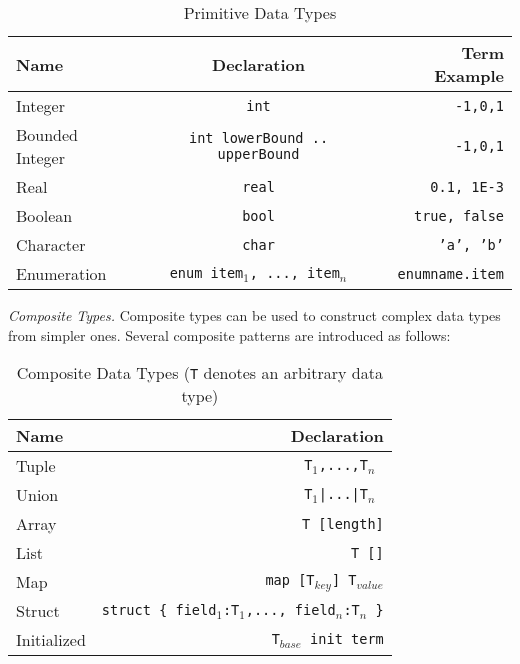 \begin{table}
    \caption{Primitive Data Types}
    \label{table:primitivetypes}
    \centering
    \begin{tabular}{lcr}
        \hline
        Name & Declaration & Term Example \T\B \\
        \hline
        \T 
        Integer & \texttt{int} & \texttt{-1,0,1} \\
        Bounded Integer\hspace{0.5cm} & \texttt{int lowerBound .. upperBound}\hspace{0.5cm} & \texttt{-1,0,1} \\
        Real & \texttt{real} & \texttt{0.1, 1E-3} \\
        Boolean & \texttt{bool} & \texttt{true, false} \\
        Character & \texttt{char} & \texttt{'a', 'b'} \\
        \B Enumeration & \texttt{enum {item$_1$, ..., item$_n$}} & \texttt{enumname.item} \\
        \hline
    \end{tabular}
\end{table}

\noindent\emph{Composite Types.} Composite types can be used to construct complex data types from simpler ones. Several composite patterns are introduced as follows:

\begin{table}
    \caption{Composite Data Types (\texttt{T} denotes an arbitrary data type)}
    \centering
    \begin{tabular}{lr}
        \hline
        Name & Declaration \T\B \\
        \hline
        \T Tuple  & \texttt{T$_1$,...,T$_n$ }\\
        Union & \texttt{T$_1$|...|T$_n$ } \\
        Array & \texttt{T [length]}\\
        List & \texttt{T []} \\
        Map & \texttt{map [T$_{key}$] T$_{value}$} \\
        Struct\hspace{1cm} & \texttt{struct \{ field$_1$:T$_1$,..., field$_n$:T$_n$ \}} \\
        \B Initialized & \texttt{T$_{base}$ init term} \\
        \hline
    \end{tabular}
\end{table}


